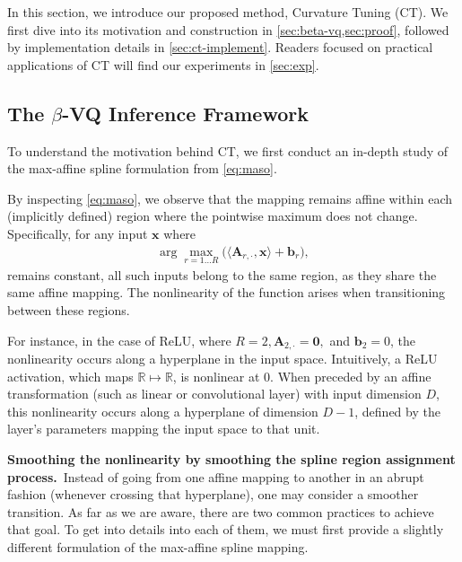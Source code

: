 In this section, we introduce our proposed method, Curvature Tuning (CT). We first dive into its motivation and construction in \cref{sec:beta-vq,sec:proof}, followed by implementation details in \cref{sec:ct-implement}. Readers focused on practical applications of CT will find our experiments in \cref{sec:exp}.


\subsection{The $\beta$-VQ Inference Framework}\label{sec:beta-vq}
To understand the motivation behind CT, we first conduct an in-depth study of the max-affine spline formulation from \cref{eq:maso}.

By inspecting \cref{eq:maso}, we observe that the mapping remains affine within each (implicitly defined) region where the pointwise maximum does not change. Specifically, for any input $\mathbf{x}$ where
\begin{align*}
    \arg\max_{r=1 \dots R} \big( \langle \mathbf{A}_{r,\cdot}, \mathbf{x} \rangle + \mathbf{b}_r \big),
\end{align*}
remains constant, all such inputs belong to the same region, as they share the same affine mapping. The nonlinearity of the function arises when transitioning between these regions. 


For instance, in the case of ReLU, where $R=2, \mathbf{A}_{2,\cdot}=\mathbf{0},$ and $\mathbf{b}_{2}=0$, the nonlinearity occurs along a hyperplane in the input space. Intuitively, a ReLU activation, which maps $\mathbb{R}\mapsto \mathbb{R}$, is nonlinear at $0$. When preceded by an affine transformation (such as linear or convolutional layer) with input dimension $D$, this nonlinearity occurs along a hyperplane of dimension $D-1$, defined by the layer’s parameters mapping the input space to that unit.

{\bf Smoothing the nonlinearity by smoothing the spline region assignment process.}~Instead of going from one affine mapping to another in an abrupt fashion (whenever crossing that hyperplane), one may consider a smoother transition. As far as we are aware, there are two common practices to achieve that goal. To get into details into each of them, we must first provide a slightly different formulation of the max-affine spline mapping.

